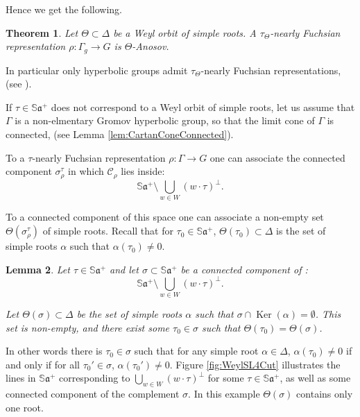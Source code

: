 \documentclass[reqno,10pt]{amsart}
\theoremstyle{plain}
\newtheorem{thm}{Theorem}[section]
\newtheorem{lem}[thm]{Lemma}
\theoremstyle{definition}
\theoremstyle{remark}
\newcommand{\type}{\tau}
\newcommand{\typeS}{{\tau_0}}
\newcommand{\Sph}{\mathbb{S}}
\DeclareMathOperator{\Ker}{Ker}
\begin{document}
Hence we get the following.

\begin{thm}
\label{thm:NearlyfuchsianAnosovNormal}
Let $\Theta\subset \Delta$ be a Weyl orbit of simple roots. A $\type_\Theta$-nearly Fuchsian representation $\rho:\Gamma_g\to G$ is $\Theta$-Anosov.
\end{thm}
 In particular only hyperbolic groups admit $\type_\Theta$-nearly Fuchsian representations, (see \cite[Theorem 3.2]{BPS}).
 
 \medskip

If $\type\in \Sph\mathfrak{a}^+$ does not correspond to a Weyl orbit of simple roots, let us assume that $\Gamma$ is a non-elmentary Gromov hyperbolic group, so that the limit cone of $\Gamma$ is connected, (see Lemma \ref{lem:CartanConeConnected}).

\medskip  

To a $\type$-nearly Fuchsian representation $\rho:\Gamma\to G$ one can associate the connected component $\sigma_\rho^\type$ in which $\mathcal{C}_\rho$ lies inside:
 $$\Sph\mathfrak{a}^+\setminus \bigcup_{w\in W} (w\cdot \type)^\perp.$$
 
To a connected component of this space one can associate a  non-empty set $\Theta(\sigma_\rho^\type)$ of simple roots. Recall that for $\typeS\in \Sph\mathfrak{a}^+$, $\Theta(\typeS)\subset \Delta$ is the set of simple roots $\alpha$ such that $\alpha(\typeS)\neq 0$.

\begin{lem}
\label{lem:ConnectedRoot}
Let $\type\in \Sph\mathfrak{a}^+$ and let $\sigma\subset \Sph\mathfrak{a}^+$ be a connected component of :
\begin{equation}
\label{eq:WeylWalls}
\Sph\mathfrak{a}^+\setminus \bigcup_{w\in W} (w\cdot \type)^\perp.\end{equation}

Let $\Theta(\sigma)\subset \Delta$ be the set of simple roots $\alpha$ such that $\sigma\cap \Ker(\alpha)=\emptyset$. This set is non-empty, and there exist some $\typeS\in \sigma$ such that $\Theta(\typeS)=\Theta(\sigma)$.
\end{lem}

In other words there is $\typeS\in \sigma$ such that for any simple root $\alpha\in \Delta$, $\alpha(\typeS)\neq 0$ if and only if for all $\typeS'\in \sigma$, $\alpha(\typeS')\neq 0$. Figure \ref{fig:WeylSL4Cut} illustrates the lines in $\Sph\mathfrak{a}^+$ corresponding to $\bigcup_{w\in W}(w\cdot \type)^\perp$ for some $\type\in\Sph\mathfrak{a}^+$, as well as some connected component of the complement $\sigma$. In this example $\Theta(\sigma)$ contains only one root.
\end{document}
